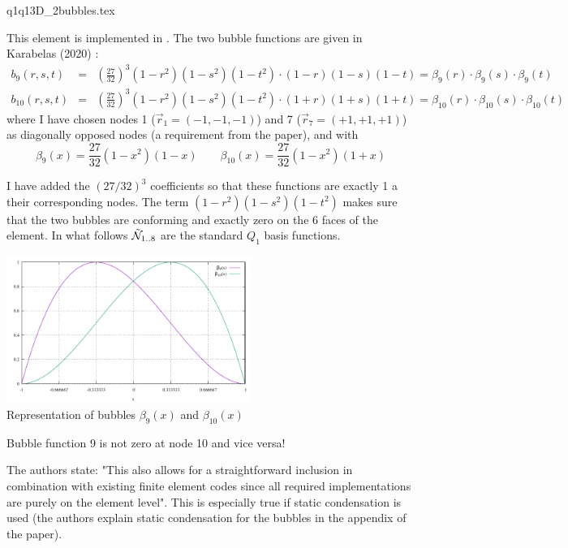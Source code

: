 \begin{flushright} {\tiny {\color{gray} q1q13D\_2bubbles.tex}} \end{flushright}

This element is implemented in .
The two bubble functions are given in Karabelas \etal (2020) \cite{kahp20}:
\begin{eqnarray}
b_9(r,s,t) &=& \left(\frac{27}{32}\right)^3 (1-r^2)(1-s^2)(1-t^2) \cdot (1-r)(1-s)(1-t) 
= \beta_9(r)\cdot\beta_9(s) \cdot \beta_9(t) \\
b_{10}(r,s,t) &=& \left(\frac{27}{32}\right)^3 (1-r^2)(1-s^2)(1-t^2) \cdot (1+r)(1+s)(1+t) 
= \beta_{10}(r)\cdot\beta_{10}(s) \cdot \beta_{10}(t) 
\end{eqnarray}
where I have chosen nodes 1 ($\vec{r}_1=(-1,-1,-1)$) and 7 ($\vec{r}_7=(+1,+1,+1)$) 
as diagonally opposed nodes (a requirement from the paper), 
and with
\[
\beta_9(x)=\frac{27}{32} (1-x^2) (1-x)
\qquad
\beta_{10}(x)=\frac{27}{32} (1-x^2) (1+x)
\]

I have added the $(27/32)^3$ coefficients so that these functions are exactly 1 a their 
corresponding nodes.
The term $(1-r^2)(1-s^2)(1-t^2)$ makes sure that the two bubbles are conforming and exactly zero 
on the 6 faces of the element.
In what follows $\tilde{{\mathcal{N}}}_{1..8}$ are the standard $Q_1$ basis functions.

\begin{center}
\includegraphics[width=8cm]{images/MINI3D/bubbles.pdf}\\
{\captionfont Representation of bubbles $\beta_9(x)$ and $\beta_{10}(x)$}
\end{center}

\begin{remark}
Bubble function 9 is not zero at node 10 and vice versa!
\end{remark}

The authors state: "This also allows for a straightforward inclusion in combination 
with existing finite element codes since all required
implementations are purely on the element level". This is especially true 
if static condensation is used (the authors explain static condensation 
for the bubbles in the appendix of the paper).

